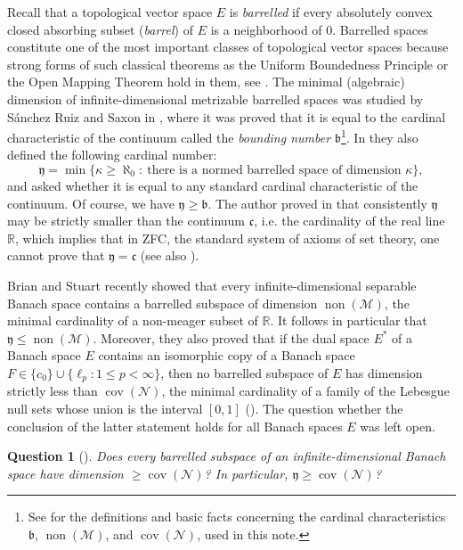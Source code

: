 \documentclass[a4paper,11pt,fleqn]{amsart}
\newtheorem{question}[theorem]{Question}
\theoremstyle{definition}
\theoremstyle{remark}
\numberwithin{equation}{section}
\newcommand{\frakb}{\mathfrak{b}}
\newcommand{\frakc}{\mathfrak{c}}
\newcommand{\fraky}{\mathfrak{y}}
\newcommand{\R}{\mathbb{R}}
\newcommand{\mM}{\mathcal{M}}
\newcommand{\nN}{\mathcal{N}}
\DeclareMathOperator{\cov}{cov}
\DeclareMathOperator{\non}{non}
\begin{document}
Recall that a topological vector space $E$ is \textit{barrelled} if every absolutely convex closed absorbing subset (\textit{barrel}) of $E$ is a neighborhood of $0$. Barrelled spaces constitute one of the most important classes of topological vector spaces because strong forms of such classical theorems as the Uniform Boundedness Principle or the Open Mapping Theorem hold in them, see \cite{Swa92}. The minimal (algebraic) dimension of infinite-dimensional metrizable barrelled spaces was studied by S\'anchez Ruiz and Saxon in \cite{SRS95,SRS96,SRS96-2}, where it was proved that it is equal to the cardinal characteristic of the continuum called the \textit{bounding number} $\frakb$\footnote{See \cite{BJ95} for the definitions and basic facts concerning the cardinal characteristics $\frakb$, $\non(\mM)$, and $\cov(\nN)$, used in this note.}. %
In \cite{SRS95} they also defined the following cardinal number:
\[\fraky=\min\big\{\kappa\ge\aleph_0\colon\ \text{there is a normed barrelled space of dimension }\kappa\big\},\]
and asked whether it is equal to any standard cardinal characteristic of the continuum. Of course, we have $\fraky\ge\frakb$. The author proved in \cite{Sob19} that consistently $\fraky$ may be strictly smaller than the continuum $\frakc$, i.e. the cardinality of the real line $\R$, which implies that in \textsf{ZFC}, the standard system of axioms of set theory, one cannot prove that $\fraky=\frakc$ (see also \cite{SZ17,SZ19}). 

Brian and Stuart \cite{BS24} recently showed that every infinite-dimensional separable Banach space contains a barrelled subspace of dimension $\non(\mM)$, the minimal cardinality of a non-meager subset of $\R$. It follows in particular that $\fraky\le\non(\mM)$. Moreover, they also proved that if the dual space $E^*$ of a Banach space $E$ contains an isomorphic copy of a Banach space $F\in\{c_0\}\cup\{\ell_p\colon 1\le p<\infty\}$, then no barrelled subspace of $E$ has dimension strictly less than $\cov(\nN)$, the minimal cardinality of a family of the Lebesgue null sets whose union is the interval $[0,1]$ (\cite[Theorem 4.11]{BS24}). The question whether the conclusion of the latter statement holds for all Banach spaces $E$ was left open.

\begin{question}[{\cite[Question 4.13]{BS24}}]\label{question}
Does every barrelled subspace of an infinite-dimensional Banach space have dimension $\ge\cov(\nN)$? In particular, $\fraky\ge\cov(\nN)$?
\end{question}
\end{document}
